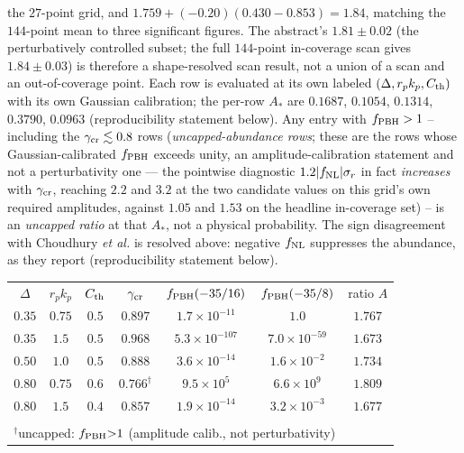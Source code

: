 \documentclass[aps,prd,twocolumn,superscriptaddress,nofootinbib,longbibliography]{revtex4-2}
\newcommand{\fnl}{f_{\rm NL}}
\newcommand{\fpbh}{f_{\rm PBH}}
\begin{document}
\begin{table}[t]
{the $27$-point grid, and $1.759+(-0.20)(0.430-0.853)=1.84$, matching the
$144$-point mean to three significant figures. The abstract's $1.81\pm0.02$
(the perturbatively controlled subset; the full $144$-point in-coverage scan gives
$1.84\pm0.03$) is therefore a shape-resolved scan result, not a union of a scan and an
out-of-coverage point. Each row is evaluated at its own labeled
$(\Delta,r_pk_p,C_{\rm th})$ with its own Gaussian calibration; the
per-row $A_*$ are $0.1687$, $0.1054$, $0.1314$, $0.3790$, $0.0963$
(reproducibility statement below). Any entry with $\fpbh>1$ -- including
the $\gamma_{\rm cr}\lesssim0.8$ rows (\emph{uncapped-abundance rows}; these are the rows
whose Gaussian-calibrated $\fpbh$ exceeds unity, an amplitude-calibration statement and not a
perturbativity one --- the pointwise diagnostic $1.2|\fnl|\sigma_r$ in fact \emph{increases}
with $\gamma_{\rm cr}$, reaching $2.2$ and $3.2$ at the two candidate values on this grid's own
required amplitudes, against $1.05$ and $1.53$ on the headline in-coverage set) -- is an
\emph{uncapped ratio} at that $A_*$, not a physical probability. The
sign disagreement with Choudhury \textit{et al.} is resolved above:
negative $\fnl$ suppresses the abundance, as they
report (reproducibility statement below).}
\begin{ruledtabular}
\begin{tabular}{ccccccc}
$\Delta$ & $r_pk_p$ & $C_{\rm th}$ & $\gamma_{\rm cr}$ & $\fpbh(-35/16)$ & $\fpbh(-35/8)$ & ratio $A$ \\
\colrule
$0.35$ & $0.75$ & $0.5$ & $0.897$ & $1.7\times10^{-11}$ & $1.0$ & $1.767$ \\
$0.35$ & $1.5$  & $0.5$ & $0.968$ & $5.3\times10^{-107}$ & $7.0\times10^{-59}$ & $1.673$ \\
$0.50$ & $1.0$  & $0.5$ & $0.888$ & $3.6\times10^{-14}$ & $1.6\times10^{-2}$ & $1.734$ \\
$0.80$ & $0.75$ & $0.6$ & $0.766^{\dagger}$ & $9.5\times10^{5}$   & $6.6\times10^{9}$  & $1.809$ \\
$0.80$ & $1.5$  & $0.4$ & $0.857$ & $1.9\times10^{-14}$ & $3.2\times10^{-3}$ & $1.677$ \\
\colrule
\multicolumn{6}{l}{\footnotesize mean ratio $1.732\,[1.610,1.809]$, std $0.050$, $n=27$} & \\
\multicolumn{6}{l}{\scriptsize $^{\dagger}$uncapped: $\fpbh{>}1$ (amplitude calib., not perturbativity)} & \\
\end{tabular}
\end{ruledtabular}
\end{table}
\end{document}

